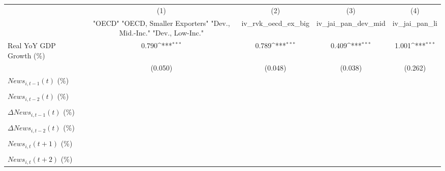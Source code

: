 {
\def\sym#1{\ifmmode^{#1}\else\(^{#1}\)\fi}
\begin{tabular}{l*{4}{c}}
\toprule
                    &\multicolumn{1}{c}{(1)}&\multicolumn{1}{c}{(2)}&\multicolumn{1}{c}{(3)}&\multicolumn{1}{c}{(4)}\\
                    &\multicolumn{1}{c}{ "OECD" "OECD, Smaller Exporters" "Dev., Mid.-Inc." "Dev., Low-Inc."}&\multicolumn{1}{c}{iv_rvk_oecd_ex_big}&\multicolumn{1}{c}{iv_jai_pan_dev_mid}&\multicolumn{1}{c}{iv_jai_pan_li}\\
\midrule
Real YoY GDP Growth (\%)&       0.790\sym{***}&       0.789\sym{***}&       0.409\sym{***}&       1.001\sym{***}\\
                    &     (0.050)         &     (0.048)         &     (0.038)         &     (0.262)         \\
\addlinespace
$ News_{i,t-1}(t)$ (\%)&                     &                     &                     &                     \\
                    &                     &                     &                     &                     \\
\addlinespace
$ News_{i,t-2}(t)$ (\%)&                     &                     &                     &                     \\
                    &                     &                     &                     &                     \\
\addlinespace
$ \Delta News_{i,t-1}(t)$ (\%)&                     &                     &                     &                     \\
                    &                     &                     &                     &                     \\
\addlinespace
$ \Delta News_{i,t-2}(t)$ (\%)&                     &                     &                     &                     \\
                    &                     &                     &                     &                     \\
\addlinespace
$ News_{i,t}(t+1)$ (\%)&                     &                     &                     &                     \\
                    &                     &                     &                     &                     \\
\addlinespace
$ News_{i,t}(t+2)$ (\%)&                     &                     &                     &                     \\

\end{tabular}}
